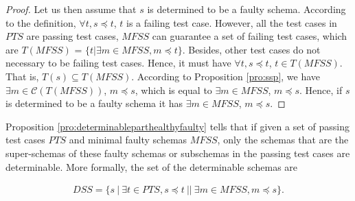 \begin{proof}
Let us then assume that $s$ is determined to be a faulty schema.  According to the definition, $\forall t, s \preceq t$, $t$ is a failing test case. However, all the test cases in $PTS$ are passing test cases, $MFSS$ can guarantee a set of failing test cases, which are $T(MFSS)$ = $\{ t | \exists m \in MFSS, m \preceq t \}$. Besides, other test cases do not necessary to be failing test cases.  Hence, it must have $\forall t, s \preceq t$, $t \in T(MFSS)$. That is, $T(s) \subseteq T(MFSS)$. According to Proposition \ref{pro:ssp}, we have $\exists m \in \mathcal{C}(T(MFSS))$, $m \preceq s$, which is equal to  $\exists m \in MFSS$, $m \preceq s$. Hence,  if $s$ is determined to be a faulty schema it has  $\exists m \in MFSS$, $m \preceq s$.


%


\end{proof}

Proposition \ref{pro:determinableparthealthyfaulty} tells that if given a set of passing test cases $PTS$ and minimal faulty schemas $MFSS$, only the schemas that are the super-schemas of these faulty schemas or subschemas in the passing test cases are determinable.  More formally, the set of the determinable schemas are

\begin{equation}
\begin{aligned}\label{eq:dss}
DSS=\{ s\ |\ \exists t \in PTS,  s \preceq t  \ || \  \exists m \in MFSS, m \preceq s \} .
\end{aligned}
\end{equation}
%

